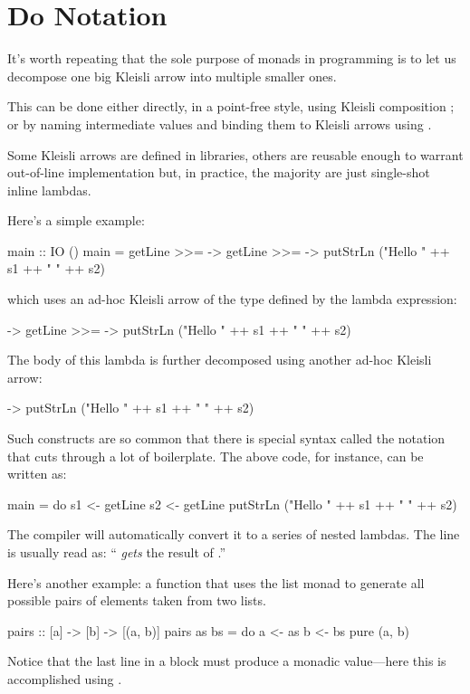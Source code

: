 \documentclass[DaoFP]{subfiles}
\begin{document}
\section{Do Notation}

It's worth repeating that the sole purpose of monads in programming is to let us decompose one big Kleisli arrow into multiple smaller ones. 

This can be done either directly, in a point-free style, using Kleisli composition \hask{<=<}; or by naming intermediate values and binding them to Kleisli arrows using \hask{>>=}. 

Some Kleisli arrows are defined in libraries, others are reusable enough to warrant out-of-line implementation but, in practice, the majority are just single-shot inline lambdas.

Here's a simple example:
\begin{haskell}
main :: IO ()
main = 
  getLine >>=  ->
    getLine >>=  ->
      putStrLn ("Hello " ++ s1 ++ " " ++ s2)
\end{haskell}
which uses an ad-hoc Kleisli arrow of the type  defined by the lambda expression:
\begin{haskell}
 ->
    getLine >>=  ->
      putStrLn ("Hello " ++ s1 ++ " " ++ s2)
\end{haskell}
The body of this lambda is further decomposed using another ad-hoc Kleisli arrow:
\begin{haskell}
 -> putStrLn ("Hello " ++ s1 ++ " " ++ s2)
\end{haskell}

Such constructs are so common that there is special syntax called the  notation that cuts through a lot of boilerplate. The above code, for instance, can be written as:
\begin{haskell}
main = do
  s1 <- getLine
  s2 <- getLine
  putStrLn ("Hello " ++ s1 ++ " " ++ s2)
\end{haskell}
The compiler will automatically convert it to a series of nested lambdas. The line  is usually read as: `` \emph{gets} the result of .''

Here's another example: a function that uses the list monad to generate all possible pairs of elements taken from two lists.
\begin{haskell}
pairs :: [a] -> [b] -> [(a, b)]
pairs as bs = do
  a <- as
  b <- bs
  pure (a, b)
\end{haskell}
Notice that the last line in a  block must produce a monadic value---here this is accomplished using .
\end{document}
